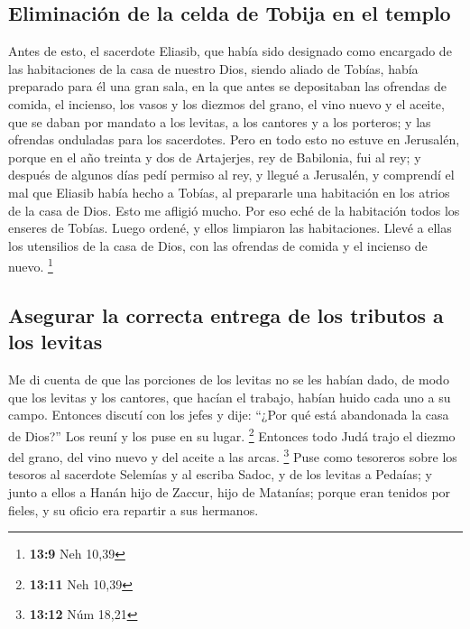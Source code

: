 \begin{paracol}{2}
\hypertarget{eliminaciuxf3n-de-la-celda-de-tobija-en-el-templo}{%
\subsection{Eliminación de la celda de Tobija en el
templo}\label{eliminaciuxf3n-de-la-celda-de-tobija-en-el-templo}}

 Antes de esto, el sacerdote Eliasib, que había sido
designado como encargado de las habitaciones de la casa de nuestro Dios,
siendo aliado de Tobías,  había preparado para él una gran
sala, en la que antes se depositaban las ofrendas de comida, el
incienso, los vasos y los diezmos del grano, el vino nuevo y el aceite,
que se daban por mandato a los levitas, a los cantores y a los porteros;
y las ofrendas onduladas para los sacerdotes.  Pero en
todo esto no estuve en Jerusalén, porque en el año treinta y dos de
Artajerjes, rey de Babilonia, fui al rey; y después de algunos días pedí
permiso al rey,  y llegué a Jerusalén, y comprendí el mal
que Eliasib había hecho a Tobías, al prepararle una habitación en los
atrios de la casa de Dios.  Esto me afligió mucho. Por eso
eché de la habitación todos los enseres de Tobías.  Luego
ordené, y ellos limpiaron las habitaciones. Llevé a ellas los utensilios
de la casa de Dios, con las ofrendas de comida y el incienso de nuevo.
\footnote{\textbf{13:9} Neh 10,39}

\hypertarget{asegurar-la-correcta-entrega-de-los-tributos-a-los-levitas}{%
\subsection{Asegurar la correcta entrega de los tributos a los
levitas}\label{asegurar-la-correcta-entrega-de-los-tributos-a-los-levitas}}

 Me di cuenta de que las porciones de los levitas no se
les habían dado, de modo que los levitas y los cantores, que hacían el
trabajo, habían huido cada uno a su campo.  Entonces
discutí con los jefes y dije: ``¿Por qué está abandonada la casa de
Dios?'' Los reuní y los puse en su lugar. \footnote{\textbf{13:11} Neh
  10,39}  Entonces todo Judá trajo el diezmo del grano,
del vino nuevo y del aceite a las arcas. \footnote{\textbf{13:12} Núm
  18,21}  Puse como tesoreros sobre los tesoros al
sacerdote Selemías y al escriba Sadoc, y de los levitas a Pedaías; y
junto a ellos a Hanán hijo de Zaccur, hijo de Matanías; porque eran
tenidos por fieles, y su oficio era repartir a sus hermanos.


\end{paracol}
